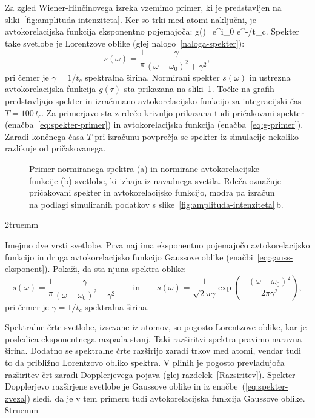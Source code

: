 Za zgled Wiener-Hinčinovega izreka vzemimo primer, ki je predstavljen na 
sliki~\ref{fig:amplituda-intenziteta}. 
Ker so trki med atomi naključni, je avtokorelacijska funkcija eksponentno pojemajoča:
\beq
g(\tau)=e^{i\omega_{0}\tau} e^{-\tau/t_{c}}.
\label{eq:g-primer}
\eeq
Spekter take svetlobe je Lorentzove 
oblike (glej nalogo~\ref{naloga-spekter}):
\begin{equation}
s(\omega)=\frac{1}{\pi}\frac{\gamma}{(\omega-\omega_{0})^{2}+\gamma^{2}},
\label{eq:spekter-primer}
\end{equation}
pri čemer je $\gamma=1/t_{c}$ spektralna širina. 
Normirani spekter $s(\omega)$ in ustrezna avtokorelacijska funkcija $g(\tau)$ 
sta prikazana na sliki~\ref{fig:SpekterAc}. 
Točke na grafih 
predstavljajo spekter in izračunano avtokorelacijsko funkcijo 
za integracijski čas $T=100\,t_{c}$. Za primerjavo sta z rdečo 
krivuljo prikazana tudi pričakovani spekter (enačba~\ref{eq:spekter-primer}) in avtokorelacijska
funkcija (enačba~\ref{eq:g-primer}). Zaradi končnega
časa $T$ pri izračunu povprečja se spekter iz simulacije nekoliko razlikuje
od pričakovanega. 
\begin{figure}[ht]
\centering
\def\svgwidth{128truemm} 

\caption{Primer normiranega spektra (a) in normirane avtokorelacijske funkcije (b) svetlobe, ki izhaja 
iz navadnega svetila. Rdeča označuje pričakovani spekter
in avtokorelacijsko funkcijo, modra pa izračun na podlagi simuliranih 
podatkov s slike~\ref{fig:amplituda-intenziteta}\,b.}
\label{fig:SpekterAc}
\end{figure}
\vglue2truemm
\begin{naloga}
\label{naloga-spekter}
Imejmo dve vrsti svetlobe. Prva naj ima eksponentno pojemajočo avtokorelacijsko funkcijo in druga
avtokorelacijsko funkcijo Gaussove oblike (enačbi~\ref{eq:gauss-eksponent}). Pokaži, da sta njuna
spektra oblike:
\begin{equation}
s(\omega)=
\frac{1}{\pi}\frac{\gamma}{(\omega-\omega_{0})^{2}+\gamma^{2}} \qquad \mathrm{in} \qquad 
s(\omega)= \frac{1}{\sqrt{2}\pi\gamma}\exp\left(-
\frac{\left(\omega-\omega_{0}\right)^{2}}{2\pi\gamma^{2}}\right)\!\!,
\end{equation}
pri čemer je $\gamma=1/t_{c}$ spektralna širina. 
\end{naloga}

Spektralne črte svetlobe, izsevane iz atomov, so pogosto Lorentzove oblike, kar je posledica
eksponentnega razpada stanj. Taki razširitvi spektra pravimo naravna širina. Dodatno se spektralne
črte razširijo zaradi trkov med atomi, vendar tudi to da približno Lorentzovo
obliko spektra. V plinih je pogosto prevladujoča razširitev črt
zaradi Dopplerjevega pojava (glej razdelek~\ref{Razsiritev}). Spekter 
Dopplerjevo razširjene svetlobe je Gaussove oblike in iz enačbe~(\ref{eq:spekter-zveza})
sledi, da je v tem primeru tudi avtokorelacijska funkcija Gaussove oblike.
\vglue8truemm

